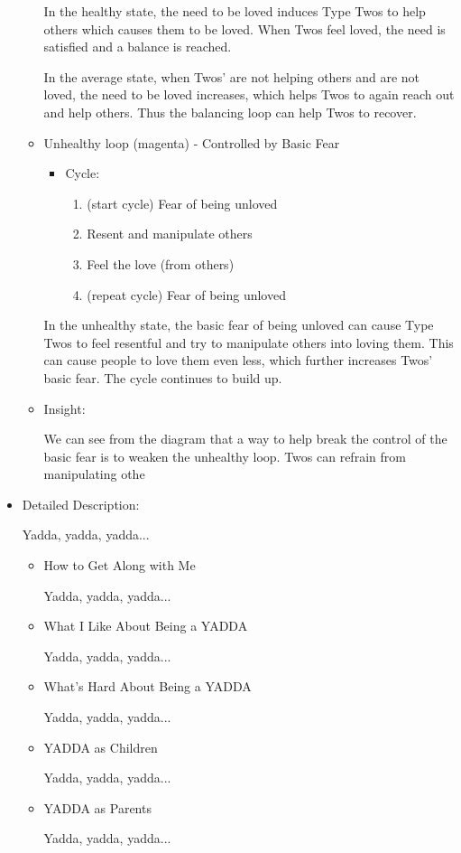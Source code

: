\documentclass[openleft,oneside,showtrims]{memoir}
\begin{document}
\begin{itemize}
\begin{itemize}
In the healthy state, the need to be loved induces Type Twos to help others which causes them to be loved. When Twos feel loved, the need is satisfied and a balance is reached.

In the average state, when Twos' are not helping others and are not loved, the need to be loved increases, which helps Twos to again reach out and help others. Thus the balancing loop can help Twos to recover.

\item Unhealthy loop (magenta) - Controlled by Basic Fear
\label{sec:org12ef584}

\begin{itemize}
\item Cycle:
\begin{enumerate}
\item (start cycle) Fear of being unloved
\item Resent and manipulate others
\item Feel the love (from others)
\item (repeat cycle) Fear of being unloved
\end{enumerate}
\end{itemize}

In the unhealthy state, the basic fear of being unloved can cause Type Twos to feel resentful and try to manipulate others into loving them. This can cause people to love them even less, which further increases Twos' basic fear. The cycle continues to build up.

\item Insight:
\label{sec:orgf935c16}

We can see from the diagram that a way to help break the control of the basic fear is to weaken the unhealthy loop. Twos can refrain from manipulating othe
\end{itemize}

\item Detailed Description:
\label{sec:org82804bc}

Yadda, yadda, yadda...

\begin{itemize}
\item How to Get Along with Me
\label{sec:org238d4a9}

Yadda, yadda, yadda...

\item What I Like About Being a YADDA
\label{sec:org996e2eb}

Yadda, yadda, yadda...

\item What's Hard About Being a YADDA
\label{sec:orgf551ff6}

Yadda, yadda, yadda...

\item YADDA as Children
\label{sec:org146c221}

Yadda, yadda, yadda...

\item YADDA as Parents
\label{sec:org7e0a3ff}

Yadda, yadda, yadda...
\end{itemize}
\end{itemize}
\end{document}
